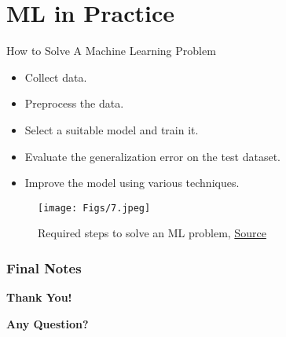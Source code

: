 \documentclass[compress,oilve]{beamer}
\begin{document}
\section{ML in Practice}
\begin{frame}{How to Solve A Machine Learning Problem}
	\begin{itemize}
		\item Collect data.
		\item Preprocess the data.
		\item Select a suitable model and train it.
		\item Evaluate the generalization error on the test dataset.
		\item Improve the model using various techniques.
	\end{itemize}

	\begin{figure}
	 \centering
	 \texttt{[image: Figs/7.jpeg]}  
	 \caption{Required steps to solve an ML problem, \href{https://tinyurl.com/2m7epjl2}{Source}}
	\end{figure}

\end{frame}


\frametitle{Final Notes}
\centering
\vspace{50 pt}
\textbf{Thank You!}
\vspace{50pt}

\textbf{Any Question?}
\end{document}
